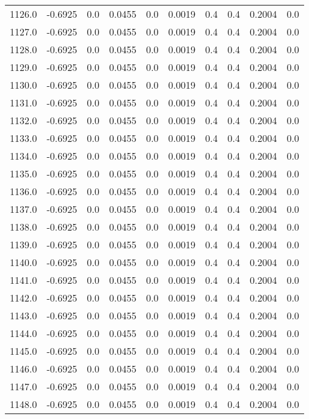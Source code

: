 \begin{longtable}{lrrrrrrrrr}
1126.0 & -0.6925 & 0.0 & 0.0455 & 0.0 & 0.0019 & 0.4 & 0.4 & 0.2004 & 0.0 \\
1127.0 & -0.6925 & 0.0 & 0.0455 & 0.0 & 0.0019 & 0.4 & 0.4 & 0.2004 & 0.0 \\
1128.0 & -0.6925 & 0.0 & 0.0455 & 0.0 & 0.0019 & 0.4 & 0.4 & 0.2004 & 0.0 \\
1129.0 & -0.6925 & 0.0 & 0.0455 & 0.0 & 0.0019 & 0.4 & 0.4 & 0.2004 & 0.0 \\
1130.0 & -0.6925 & 0.0 & 0.0455 & 0.0 & 0.0019 & 0.4 & 0.4 & 0.2004 & 0.0 \\
1131.0 & -0.6925 & 0.0 & 0.0455 & 0.0 & 0.0019 & 0.4 & 0.4 & 0.2004 & 0.0 \\
1132.0 & -0.6925 & 0.0 & 0.0455 & 0.0 & 0.0019 & 0.4 & 0.4 & 0.2004 & 0.0 \\
1133.0 & -0.6925 & 0.0 & 0.0455 & 0.0 & 0.0019 & 0.4 & 0.4 & 0.2004 & 0.0 \\
1134.0 & -0.6925 & 0.0 & 0.0455 & 0.0 & 0.0019 & 0.4 & 0.4 & 0.2004 & 0.0 \\
1135.0 & -0.6925 & 0.0 & 0.0455 & 0.0 & 0.0019 & 0.4 & 0.4 & 0.2004 & 0.0 \\
1136.0 & -0.6925 & 0.0 & 0.0455 & 0.0 & 0.0019 & 0.4 & 0.4 & 0.2004 & 0.0 \\
1137.0 & -0.6925 & 0.0 & 0.0455 & 0.0 & 0.0019 & 0.4 & 0.4 & 0.2004 & 0.0 \\
1138.0 & -0.6925 & 0.0 & 0.0455 & 0.0 & 0.0019 & 0.4 & 0.4 & 0.2004 & 0.0 \\
1139.0 & -0.6925 & 0.0 & 0.0455 & 0.0 & 0.0019 & 0.4 & 0.4 & 0.2004 & 0.0 \\
1140.0 & -0.6925 & 0.0 & 0.0455 & 0.0 & 0.0019 & 0.4 & 0.4 & 0.2004 & 0.0 \\
1141.0 & -0.6925 & 0.0 & 0.0455 & 0.0 & 0.0019 & 0.4 & 0.4 & 0.2004 & 0.0 \\
1142.0 & -0.6925 & 0.0 & 0.0455 & 0.0 & 0.0019 & 0.4 & 0.4 & 0.2004 & 0.0 \\
1143.0 & -0.6925 & 0.0 & 0.0455 & 0.0 & 0.0019 & 0.4 & 0.4 & 0.2004 & 0.0 \\
1144.0 & -0.6925 & 0.0 & 0.0455 & 0.0 & 0.0019 & 0.4 & 0.4 & 0.2004 & 0.0 \\
1145.0 & -0.6925 & 0.0 & 0.0455 & 0.0 & 0.0019 & 0.4 & 0.4 & 0.2004 & 0.0 \\
1146.0 & -0.6925 & 0.0 & 0.0455 & 0.0 & 0.0019 & 0.4 & 0.4 & 0.2004 & 0.0 \\
1147.0 & -0.6925 & 0.0 & 0.0455 & 0.0 & 0.0019 & 0.4 & 0.4 & 0.2004 & 0.0 \\
1148.0 & -0.6925 & 0.0 & 0.0455 & 0.0 & 0.0019 & 0.4 & 0.4 & 0.2004 & 0.0 \\

\end{longtable}
